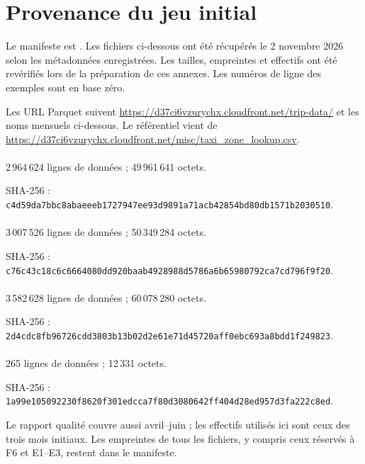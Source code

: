 \section{Provenance du jeu initial}\label{ann:provenance}
Le manifeste est . Les fichiers ci-dessous ont été
récupérés le 2 novembre 2026 selon les métadonnées enregistrées. Les tailles,
empreintes et effectifs ont été revérifiés lors de la préparation de ces annexes.
Les numéros de ligne des exemples sont en base zéro.

Les URL Parquet suivent \url{https://d37ci6vzurychx.cloudfront.net/trip-data/}
et les noms mensuels ci-dessous. Le référentiel vient de
\url{https://d37ci6vzurychx.cloudfront.net/misc/taxi_zone_lookup.csv}.

\paragraph{}
2\,964\,624 lignes de données ; 49\,961\,641 octets.
\par SHA-256 : \texttt{c4d59da7\allowbreak{}bbc8abae\allowbreak{}eeb17279\allowbreak{}47ee93d9\allowbreak{}891a71ac\allowbreak{}b42854bd\allowbreak{}80db1571\allowbreak{}b2030510}.

\paragraph{}
3\,007\,526 lignes de données ; 50\,349\,284 octets.
\par SHA-256 : \texttt{c76c43c1\allowbreak{}8c6c6664\allowbreak{}080dd920\allowbreak{}baab4928\allowbreak{}988d5786\allowbreak{}a6b65980\allowbreak{}792ca7cd\allowbreak{}796f9f20}.

\paragraph{}
3\,582\,628 lignes de données ; 60\,078\,280 octets.
\par SHA-256 : \texttt{2d4cdc8f\allowbreak{}b96726cd\allowbreak{}d3803b13\allowbreak{}b02d2e61\allowbreak{}e71d4572\allowbreak{}0aff0ebc\allowbreak{}693a8bdd\allowbreak{}1f249823}.

\paragraph{}
265 lignes de données ; 12\,331 octets.
\par SHA-256 : \texttt{1a99e105\allowbreak{}092230f8\allowbreak{}620f301e\allowbreak{}dcca7f80\allowbreak{}d3080642\allowbreak{}ff404d28\allowbreak{}ed957d3f\allowbreak{}a222c8ed}.

Le rapport qualité couvre aussi avril--juin ; les effectifs utilisés ici sont
ceux des trois mois initiaux. Les empreintes de tous les fichiers, y compris
ceux réservés à F6 et E1--E3, restent dans le manifeste.
